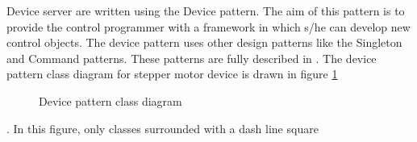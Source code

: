 Device server are written using the Device pattern.
The aim of this pattern is to provide the control programmer with
a framework in which s/he can develop new control objects. The device
pattern uses other design patterns like the Singleton
and Command patterns. These patterns are fully described in \cite{Patterns}.
The device pattern class diagram for stepper motor device is drawn
in figure \ref{Dvice pattern figure}
\begin{figure}
\begin{centering}
\par\end{centering}
\caption{Device pattern class diagram\label{Dvice pattern figure}}
\end{figure}
. In this figure, only classes surrounded with a dash line square
